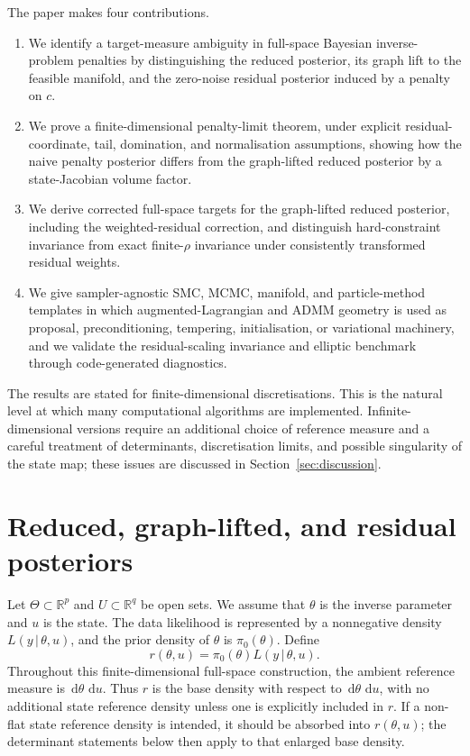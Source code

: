 \documentclass[11pt]{article}
\newcommand{\R}{\mathbb{R}}
\newcommand{\dd}{\,\mathrm{d}}
\newcommand{\given}{\,|\,}
\begin{document}
The paper makes four contributions.
\begin{enumerate}[leftmargin=*]
 \item We identify a target-measure ambiguity in full-space Bayesian inverse-problem penalties by distinguishing the reduced posterior, its graph lift to the feasible manifold, and the zero-noise residual posterior induced by a penalty on \(c\).
 \item We prove a finite-dimensional penalty-limit theorem, under explicit residual-coordinate, tail, domination, and normalisation assumptions, showing how the naive penalty posterior differs from the graph-lifted reduced posterior by a state-Jacobian volume factor.
  \item We derive corrected full-space targets for the graph-lifted reduced posterior, including the weighted-residual correction, and distinguish hard-constraint invariance from exact finite-\(\rho\) invariance under consistently transformed residual weights.
 \item We give sampler-agnostic SMC, MCMC, manifold, and particle-method templates in which augmented-Lagrangian and ADMM geometry is used as proposal, preconditioning, tempering, initialisation, or variational machinery, and we validate the residual-scaling invariance and elliptic benchmark through code-generated diagnostics.
\end{enumerate}

The results are stated for finite-dimensional discretisations. This is the natural level at which many computational algorithms are implemented. Infinite-dimensional versions require an additional choice of reference measure and a careful treatment of determinants, discretisation limits, and possible singularity of the state map; these issues are discussed in Section~\ref{sec:discussion}.

\section{Reduced, graph-lifted, and residual posteriors}
\label{sec:posteriors}

Let \(\Theta\subset\R^p\) and \(U\subset\R^q\) be open sets. We assume that \(\theta\) is the inverse parameter and \(u\) is the state. The data likelihood is represented by a nonnegative density \(L(y\given\theta,u)\), and the prior density of \(\theta\) is \(\pi_0(\theta)\). Define
\[
 r(\theta,u)=\pi_0(\theta)L(y\given\theta,u).
\]
Throughout this finite-dimensional full-space construction, the ambient reference measure is \( \dd\theta\,\dd u \). Thus \(r\) is the base density with respect to \( \dd\theta\,\dd u \), with no additional state reference density unless one is explicitly included in \(r\). If a non-flat state reference density is intended, it should be absorbed into \(r(\theta,u)\); the determinant statements below then apply to that enlarged base density.
\end{document}
